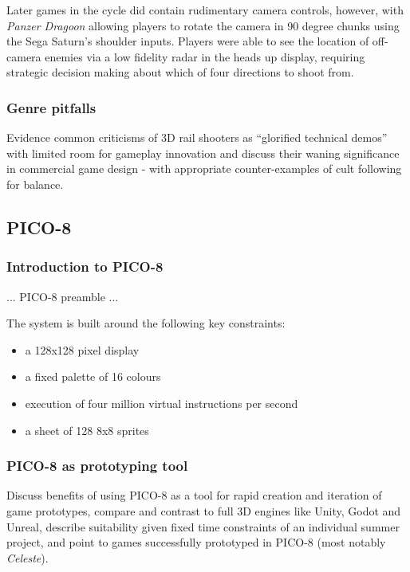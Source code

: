 \documentclass{article}
\begin{document}

Later games in the cycle did contain rudimentary camera controls, however, with \textit{Panzer Dragoon}
allowing players to rotate the camera in 90 degree chunks using the Sega Saturn's shoulder inputs.
Players were able to see the location of off-camera enemies via a low fidelity radar in the heads up
display, requiring strategic decision making about which of four directions to shoot from.

\subsubsection*{Genre pitfalls}
Evidence common criticisms of 3D rail shooters as ``glorified technical demos'' with
limited room for gameplay innovation and discuss their waning significance in
commercial game design - with appropriate counter-examples of cult following for
balance.

\subsection{PICO-8}
\subsubsection*{Introduction to PICO-8}

... PICO-8 preamble ...

The system is built around the following key constraints\cite{white}:

\begin{itemize}
   \item a 128x128 pixel display
   \item a fixed palette of 16 colours
   \item execution of four million virtual instructions per second
   \item a sheet of 128 8x8 sprites
\end{itemize}

\subsubsection*{PICO-8 as prototyping tool}
Discuss benefits of using PICO-8 as a tool for rapid creation and iteration of
game prototypes, compare and contrast to full 3D engines like Unity, Godot and Unreal,
describe suitability given fixed time constraints of an individual summer
project, and point to games successfully prototyped in PICO-8 (most notably
\textit{Celeste}).
\end{document}
